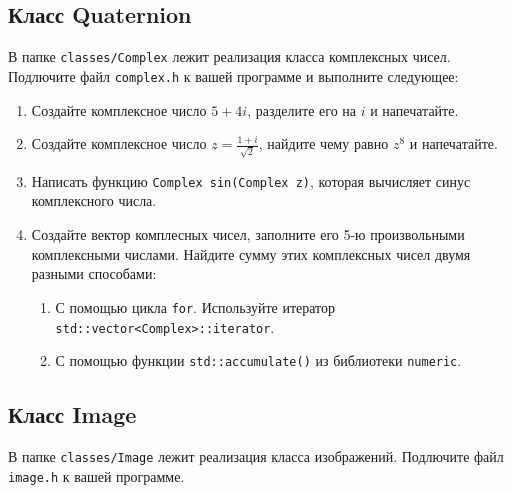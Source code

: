 \documentclass{article}
\begin{document}
\subsection*{Класс Quaternion}
В папке \texttt{classes/Complex} лежит реализация класса комплексных чисел. Подлючите файл \texttt{complex.h} к вашей программе и выполните следующее:
\begin{enumerate}
\item Создайте комплексное число $5+4i$, разделите его на $i$ и напечатайте.
\item Создайте комплексное число $z = \frac{1+i}{\sqrt{2}}$, найдите чему равно $z^8$ и напечатайте.
\item Написать функцию \texttt{Complex sin(Complex z)}, которая вычисляет синус комплексного числа.
\item Создайте вектор комплесных чисел, заполните его 5-ю произвольными комплексными числами. Найдите сумму этих комплексных чисел двумя разными способами:
	\begin{enumerate}
	\item С помощью цикла \texttt{for}. Используйте итератор \texttt{std::vector<Complex>::iterator}.
	\item С помощью функции \texttt{std::accumulate()} из библиотеки \texttt{numeric}.
	\end{enumerate}
\end{enumerate}
\subsection*{Класс Image}
В папке \texttt{classes/Image} лежит реализация класса изображений. Подлючите файл \texttt{image.h} к вашей программе.
\begin{figure}[H]
\end{figure}
\end{document}
